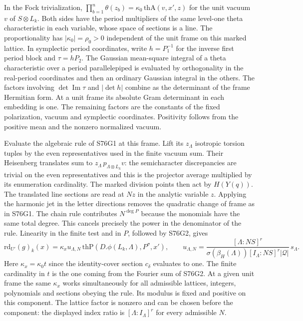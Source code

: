 In the Fock trivialization, $\prod_{b=1}^n\theta(z_b)=
\kappa_0\,\mathrm{thA}(v,x',z)$ for the unit vacuum $v$ of
$S\otimes L_k$. Both sides have the period multipliers of the
same level-one theta characteristic in each variable, whose
space of sections is a line. The proportionality has
$|\kappa_0|=\rho_0>0$ independent of the unit frame on this
marked lattice. In symplectic period coordinates, write
$h=P_1^{-1}$ for the inverse first period block and
$\tau=hP_2$. The Gaussian mean-square integral of a theta
characteristic over a period parallelepiped is evaluated by
orthogonality in the real-period coordinates and then an ordinary
Gaussian integral in the others. The factors involving
$\det\operatorname{Im}\tau$ and $|\det h|$ combine as the
determinant of the frame Hermitian form. At a unit frame its
absolute Gram determinant in each embedding is one. The remaining
factors are the constants of the fixed polarization, vacuum and
symplectic coordinates. Positivity follows from the positive mean
and the nonzero normalized vacuum.

Evaluate the algebraic rule of S76G1 at this frame. Lift its $z_\Lambda$
isotropic torsion tuples by the even representatives used in the
finite vacuum sum. Their Heisenberg translates sum to
$z_\Lambda\,p_{\Lambda\otimes L_k}v$: the semicharacter discrepancies
are trivial on the even representatives and this is the projector
average multiplied by its enumeration cardinality. The marked
division points then act by $H(Y(q))$. The translated line sections
are read at $Nz$ in the analytic variable $z$.
Applying the harmonic jet in the letter directions removes the
quadratic change of frame as in S76G1. The chain rule contributes
$N^{\deg P}$ because the monomials have the same total degree.
This cancels precisely the power in the denominator of the rule.
Linearity in the finite test and in $P$, followed by S76G2, gives
\[
 \mathrm{rd}_{U'}(g)_k(x)
    =\kappa_x u_{\Lambda,N}\,\mathrm{thP}
          (D.\phi(L_k,\Lambda),P^\sigma,x'),\qquad
 u_{\Lambda,N}=
    \frac{[\Lambda:NS]^r}{\sigma(\beta_H(\Lambda))
                    [I_\Lambda:NS]^r|\mathcal Q|}\,s_\Lambda .
\]
Here $\kappa_x=\kappa_0t$ since the identity-cover section
$c_\delta$ evaluates to one. The finite cardinality in $t$ is
the one coming from the Fourier sum of S76G2.
At a given unit frame the same $\kappa_x$ works simultaneously
for all admissible lattices, integers, polynomials and sections
obeying the rule. Its modulus is fixed and positive on this
component. The lattice factor is nonzero and can be chosen before
the component: the displayed index ratio is $[\Lambda:I_\Lambda]^r$
for every admissible $N$.

